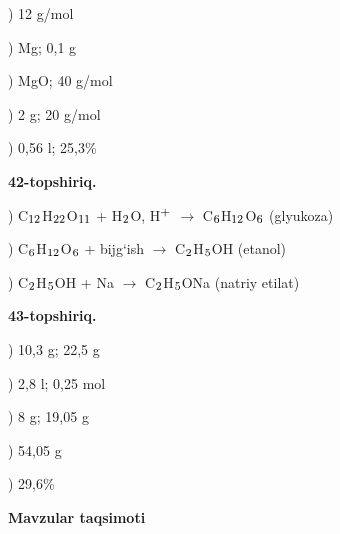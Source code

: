 \documentclass[11pt,a4paper]{article}
\renewcommand{\textsubscript}[1]{\ensuremath{_{\text{\fontsize{8}{8}\selectfont #1}}}}
\renewcommand{\textsuperscript}[1]{\ensuremath{^{\text{\fontsize{8}{8}\selectfont #1}}}}
\begin{document}
) 12 g/mol\par
{}) Mg; 0,1 g\par
{}) MgO; 40 g/mol\par
{}) 2 g; 20 g/mol\par
{}) 0,56 l; 25,3\%\par
\noindent\textbf{42-topshiriq.}\par
{}) C\textsubscript{12}H\textsubscript{22}O\textsubscript{11} + H\textsubscript{2}O, H\textsuperscript{+} $\to$ C\textsubscript{6}H\textsubscript{12}O\textsubscript{6} (glyukoza)\par
{}) C\textsubscript{6}H\textsubscript{12}O\textsubscript{6} + bijg`ish $\to$ C\textsubscript{2}H\textsubscript{5}OH (etanol)\par
{}) C\textsubscript{2}H\textsubscript{5}OH + Na $\to$ C\textsubscript{2}H\textsubscript{5}ONa (natriy etilat)\par
\noindent\textbf{43-topshiriq.}\par
{}) 10,3 g; 22,5 g\par
{}) 2,8 l; 0,25 mol\par
{}) 8 g; 19,05 g\par
{}) 54,05 g\par
{}) 29,6\%\par
\par\bigskip\noindent\textbf{Mavzular taqsimoti}\par\smallskip
\end{document}

